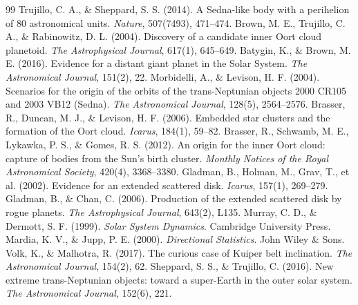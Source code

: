 \documentclass[11pt,a4paper]{article}
\begin{document}
\begin{thebibliography}{99}
 Trujillo, C. A., \& Sheppard, S. S. (2014). A Sedna-like body with a perihelion of 80 astronomical units. \textit{Nature}, 507(7493), 471--474.
 Brown, M. E., Trujillo, C. A., \& Rabinowitz, D. L. (2004). Discovery of a candidate inner Oort cloud planetoid. \textit{The Astrophysical Journal}, 617(1), 645--649.
 Batygin, K., \& Brown, M. E. (2016). Evidence for a distant giant planet in the Solar System. \textit{The Astronomical Journal}, 151(2), 22.
 Morbidelli, A., \& Levison, H. F. (2004). Scenarios for the origin of the orbits of the trans-Neptunian objects 2000 CR105 and 2003 VB12 (Sedna). \textit{The Astronomical Journal}, 128(5), 2564--2576.
 Brasser, R., Duncan, M. J., \& Levison, H. F. (2006). Embedded star clusters and the formation of the Oort cloud. \textit{Icarus}, 184(1), 59--82.
 Brasser, R., Schwamb, M. E., Lykawka, P. S., \& Gomes, R. S. (2012). An origin for the inner Oort cloud: capture of bodies from the Sun's birth cluster. \textit{Monthly Notices of the Royal Astronomical Society}, 420(4), 3368--3380.
 Gladman, B., Holman, M., Grav, T., et al. (2002). Evidence for an extended scattered disk. \textit{Icarus}, 157(1), 269--279.
 Gladman, B., \& Chan, C. (2006). Production of the extended scattered disk by rogue planets. \textit{The Astrophysical Journal}, 643(2), L135.
 Murray, C. D., \& Dermott, S. F. (1999). \textit{Solar System Dynamics}. Cambridge University Press.
 Mardia, K. V., \& Jupp, P. E. (2000). \textit{Directional Statistics}. John Wiley \& Sons.
 Volk, K., \& Malhotra, R. (2017). The curious case of Kuiper belt inclination. \textit{The Astronomical Journal}, 154(2), 62.
 Sheppard, S. S., \& Trujillo, C. (2016). New extreme trans-Neptunian objects: toward a super-Earth in the outer solar system. \textit{The Astronomical Journal}, 152(6), 221.
\end{thebibliography}
\end{document}
